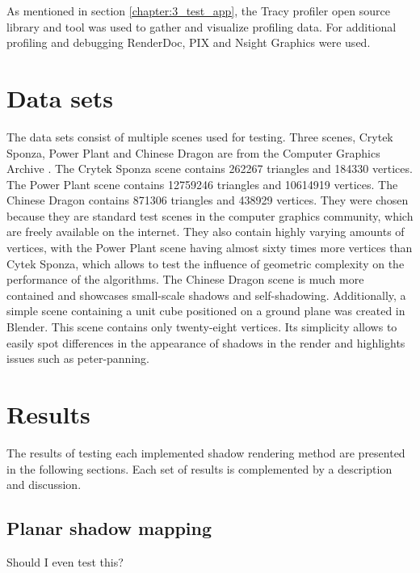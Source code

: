 As mentioned in section \ref{chapter:3_test_app}, the Tracy profiler open source library and tool was used to gather and visualize profiling data. For additional profiling and debugging RenderDoc, PIX and Nsight Graphics were used.

\section{Data sets}
The data sets consist of multiple scenes used for testing. Three scenes, Crytek Sponza, Power Plant and Chinese Dragon are from the Computer Graphics Archive \cite{bib:internet:test_scenes}. The Crytek Sponza scene contains 262267 triangles and 184330 vertices. The Power Plant scene contains 12759246 triangles and 10614919 vertices. The Chinese Dragon contains 871306 triangles and 438929 vertices. They were chosen because they are standard test scenes in the computer graphics community, which are freely available on the internet. They also contain highly varying amounts of vertices, with the Power Plant scene having almost sixty times more vertices than Cytek Sponza, which allows to test the influence of geometric complexity on the performance of the algorithms. The Chinese Dragon scene is much more contained and showcases small-scale shadows and self-shadowing. Additionally, a simple scene containing a unit cube positioned on a ground plane was created in Blender. This scene contains only twenty-eight vertices. Its simplicity allows to easily spot differences in the appearance of shadows in the render and highlights issues such as peter-panning.

\section{Results}

The results of testing each implemented shadow rendering method are presented in the following sections. Each set of results is complemented by a description and discussion.

\subsection{Planar shadow mapping}
Should I even test this?

